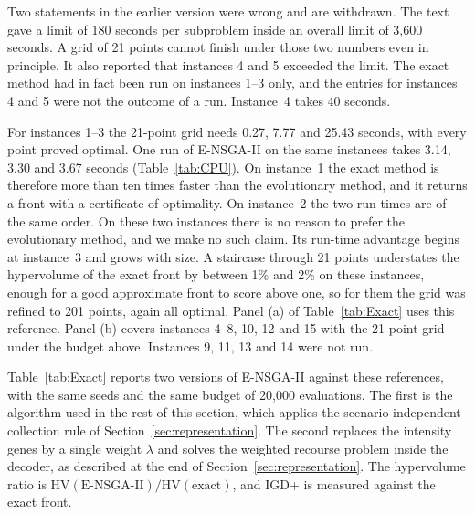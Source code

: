\documentclass[11pt, a4paper]{article}
\begin{document}
Two statements in the earlier version were wrong and are withdrawn. The text gave a limit of 180 seconds per subproblem inside an overall limit of 3{,}600 seconds. A grid of 21 points cannot finish under those two numbers even in principle. It also reported that instances 4 and 5 exceeded the limit. The exact method had in fact been run on instances 1--3 only, and the entries for instances 4 and 5 were not the outcome of a run. Instance~4 takes 40 seconds.

For instances 1--3 the 21-point grid needs 0.27, 7.77 and 25.43 seconds, with every point proved optimal. One run of E-NSGA-II on the same instances takes 3.14, 3.30 and 3.67 seconds (Table~\ref{tab:CPU}). On instance~1 the exact method is therefore more than ten times faster than the evolutionary method, and it returns a front with a certificate of optimality. On instance~2 the two run times are of the same order. On these two instances there is no reason to prefer the evolutionary method, and we make no such claim. Its run-time advantage begins at instance~3 and grows with size. A staircase through 21 points understates the hypervolume of the exact front by between 1\% and 2\% on these instances, enough for a good approximate front to score above one, so for them the grid was refined to 201 points, again all optimal. Panel (a) of Table~\ref{tab:Exact} uses this reference. Panel (b) covers instances 4--8, 10, 12 and 15 with the 21-point grid under the budget above. Instances 9, 11, 13 and 14 were not run.

Table~\ref{tab:Exact} reports two versions of E-NSGA-II against these references, with the same seeds and the same budget of 20{,}000 evaluations. The first is the algorithm used in the rest of this section, which applies the scenario-independent collection rule of Section~\ref{sec:representation}. The second replaces the intensity genes by a single weight $\lambda$ and solves the weighted recourse problem inside the decoder, as described at the end of Section~\ref{sec:representation}. The hypervolume ratio is $\mathrm{HV}(\text{E-NSGA-II})/\mathrm{HV}(\text{exact})$, and IGD+ is measured against the exact front.
\end{document}
